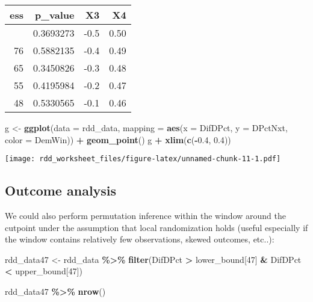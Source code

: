 \documentclass[
  12pt,
  leqno]{article}
\newenvironment{Shaded}{\begin{snugshade}}{\end{snugshade}}
\newcommand{\AttributeTok}[1]{\textcolor[rgb]{0.13,0.29,0.53}{#1}}
\newcommand{\DecValTok}[1]{\textcolor[rgb]{0.00,0.00,0.81}{#1}}
\newcommand{\FloatTok}[1]{\textcolor[rgb]{0.00,0.00,0.81}{#1}}
\newcommand{\FunctionTok}[1]{\textcolor[rgb]{0.13,0.29,0.53}{\textbf{#1}}}
\newcommand{\NormalTok}[1]{#1}
\newcommand{\OtherTok}[1]{\textcolor[rgb]{0.56,0.35,0.01}{#1}}
\newcommand{\SpecialCharTok}[1]{\textcolor[rgb]{0.81,0.36,0.00}{\textbf{#1}}}
\begin{document}
\begin{longtable}[]{@{}rrrr@{}}
\toprule\noalign{}
ess & p\_value & X3 & X4 \\
\midrule\noalign{}
\endhead
\bottomrule\noalign{}
\endlastfoot
85 & 0.3693273 & -0.5 & 0.50 \\
76 & 0.5882135 & -0.4 & 0.49 \\
65 & 0.3450826 & -0.3 & 0.48 \\
55 & 0.4195984 & -0.2 & 0.47 \\
48 & 0.5330565 & -0.1 & 0.46 \\
\end{longtable}

\normalsize

\scriptsize

\begin{Shaded}
\begin{Highlighting}[]
\NormalTok{g }\OtherTok{\textless{}{-}} \FunctionTok{ggplot}\NormalTok{(}\AttributeTok{data =}\NormalTok{ rdd\_data, }\AttributeTok{mapping =} \FunctionTok{aes}\NormalTok{(}\AttributeTok{x =}\NormalTok{ DifDPct, }\AttributeTok{y =}\NormalTok{ DPctNxt, }\AttributeTok{color =}\NormalTok{ DemWin)) }\SpecialCharTok{+}
    \FunctionTok{geom\_point}\NormalTok{()}
\NormalTok{g }\SpecialCharTok{+} \FunctionTok{xlim}\NormalTok{(}\FunctionTok{c}\NormalTok{(}\SpecialCharTok{{-}}\FloatTok{0.4}\NormalTok{, }\FloatTok{0.4}\NormalTok{))}
\end{Highlighting}
\end{Shaded}

\texttt{[image: rdd\_worksheet\_files/figure-latex/unnamed-chunk-11-1.pdf]}
\normalsize

\subsection{Outcome analysis}

We could also perform permutation inference within the window around the
cutpoint under the assumption that local randomization holds (useful
especially if the window contains relatively few observations, skewed
outcomes, etc..):

\scriptsize

\begin{Shaded}
\begin{Highlighting}[]
\NormalTok{rdd\_data47 }\OtherTok{\textless{}{-}}\NormalTok{ rdd\_data }\SpecialCharTok{\%\textgreater{}\%}
    \FunctionTok{filter}\NormalTok{(DifDPct }\SpecialCharTok{\textgreater{}}\NormalTok{ lower\_bound[}\DecValTok{47}\NormalTok{] }\SpecialCharTok{\&}\NormalTok{ DifDPct }\SpecialCharTok{\textless{}}\NormalTok{ upper\_bound[}\DecValTok{47}\NormalTok{])}

\NormalTok{rdd\_data47 }\SpecialCharTok{\%\textgreater{}\%}
    \FunctionTok{nrow}\NormalTok{()}
\end{Highlighting}
\end{Shaded}
\end{document}
